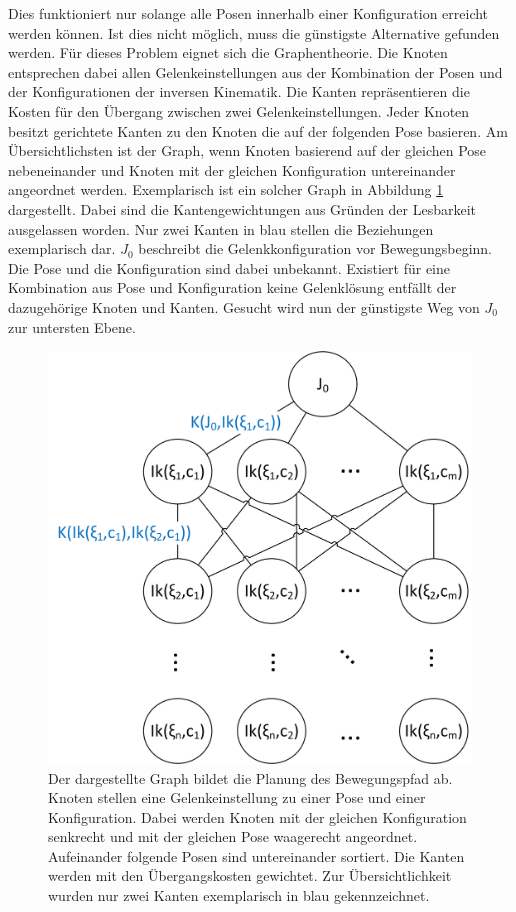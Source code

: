 Dies funktioniert nur solange alle Posen innerhalb einer Konfiguration erreicht werden können. Ist dies nicht möglich, muss die günstigste Alternative gefunden werden. Für dieses Problem eignet sich die Graphentheorie. Die Knoten entsprechen dabei allen Gelenkeinstellungen aus der Kombination der Posen und der Konfigurationen der inversen Kinematik. Die Kanten repräsentieren die Kosten für den Übergang zwischen zwei Gelenkeinstellungen. Jeder Knoten besitzt gerichtete Kanten zu den Knoten die auf der folgenden Pose basieren. Am Übersichtlichsten ist der Graph, wenn Knoten basierend auf der gleichen Pose nebeneinander und Knoten mit der gleichen Konfiguration untereinander angeordnet werden. Exemplarisch ist ein solcher Graph in Abbildung \ref{fig:plangraph} dargestellt. Dabei sind die Kantengewichtungen aus Gründen der Lesbarkeit ausgelassen worden. Nur zwei Kanten in blau stellen die Beziehungen exemplarisch dar. $J_0$ beschreibt die Gelenkkonfiguration vor Bewegungsbeginn. Die Pose und die Konfiguration sind dabei unbekannt. Existiert für eine Kombination aus Pose und Konfiguration keine Gelenklösung entfällt der dazugehörige Knoten und Kanten. Gesucht wird nun der günstigste Weg von $J_0$ zur untersten Ebene.

\begin{figure}[h]
	\centering
	\includegraphics[scale=0.7]{fig/graphplan}
	\caption[Graph zur Pfadplanung]{Der dargestellte Graph bildet die Planung des Bewegungspfad ab. Knoten stellen eine Gelenkeinstellung zu einer Pose und einer Konfiguration. Dabei werden Knoten mit der gleichen Konfiguration senkrecht und mit der gleichen Pose waagerecht angeordnet. Aufeinander folgende Posen sind untereinander sortiert. Die Kanten werden mit den Übergangskosten gewichtet. Zur Übersichtlichkeit wurden nur zwei Kanten exemplarisch in blau gekennzeichnet.}
	\label{fig:plangraph}
\end{figure}

